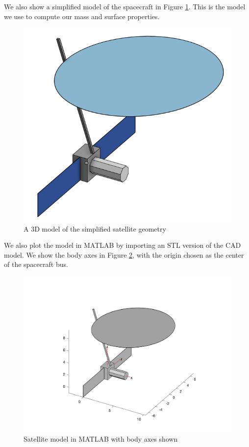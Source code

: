 We also show a simplified model of the spacecraft in Figure \ref{fig:simple_model}. This is the model we use to compute our mass and surface properties.

\begin{figure}[H]
\centering
\includegraphics[scale=0.4]{Images/ps1_simple_model.png}
\caption{A 3D model of the simplified satellite geometry}
\label{fig:simple_model}
\end{figure}

We also plot the model in MATLAB by importing an STL version of the CAD model. We show the body axes in Figure \ref{fig:MATLAB_model}, with the origin chosen as the center of the spacecraft bus.

\begin{figure}[H]
\centering
\includegraphics[scale=0.7]{Images/ps1_model.png}
\caption{Satellite model in MATLAB with body axes shown}
\label{fig:MATLAB_model}
\end{figure}

